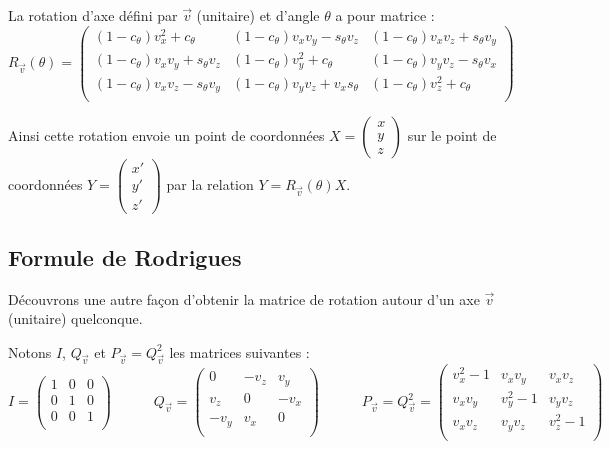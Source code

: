 \documentclass[11pt,class=report,crop=false]{standalone}
\begin{document}
La rotation d'axe défini par $\vec v$ (unitaire) et d'angle $\theta$ a pour matrice :
$$R_{\vec v}(\theta) = 
\begin{pmatrix}
(1-c_\theta)v_x^2 + c_\theta & (1-c_\theta) v_x v_y - s_\theta v_z & (1-c_\theta) v_x v_z + s_\theta v_y \\
(1-c_\theta) v_x v_y + s_\theta v_z & (1-c_\theta)v_y^2 + c_\theta & (1-c_\theta) v_y v_z - s_\theta v_x \\
 (1-c_\theta) v_x v_z - s_\theta v_y  & (1-c_\theta)v_y v_z + v_x s_\theta & (1-c_\theta)v_z^2 + c_\theta \\
\end{pmatrix}
$$

Ainsi cette rotation envoie un point de coordonnées $X = \left(\begin{smallmatrix} x\\y\\z \end{smallmatrix} \right)$ sur le point de coordonnées $Y = \left(\begin{smallmatrix} x'\\y'\\z' \end{smallmatrix} \right)$ par la relation 
$Y = R_{\vec v}(\theta) X$.

\subsection{Formule de Rodrigues}


Découvrons une autre façon d'obtenir la matrice de rotation autour d'un axe $\vec v$ (unitaire) quelconque.

Notons $I$, $Q_{\vec v}$ et $P_{\vec v} = Q_{\vec v}^2$ les matrices suivantes :
$$
I = \begin{pmatrix}
1 & 0 & 0 \\
0 & 1 & 0 \\
0 & 0 & 1 \\
\end{pmatrix}
\qquad\quad
Q_{\vec v} = \begin{pmatrix}
0 & -v_z & v_y \\
v_z & 0 & -v_x \\
-v_y & v_x & 0 \\
\end{pmatrix}
\qquad\quad
P_{\vec v} = Q_{\vec v}^2 =
\begin{pmatrix}
v_x^2-1 & v_x v_y & v_x v_z \\
v_x v_y & v_y^2-1 & v_y v_z \\
v_x v_z & v_y v_z & v_z^2-1 \\
\end{pmatrix} 
$$
\end{document}
